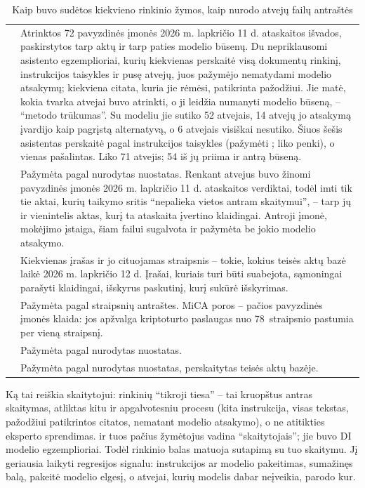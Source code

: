 \begin{table}[H]
\caption{Kaip buvo sudėtos kiekvieno rinkinio žymos, kaip nurodo atvejų failų antraštės}\label{tab:control:labels}
\begin{tabularx}{\textwidth}{@{}L{22mm}Y@{}}
\toprule
{} &  \\
\midrule
{} & Atrinktos 72 pavyzdinės įmonės 2026 m. lapkričio 11 d. ataskaitos išvados, paskirstytos tarp aktų ir tarp paties modelio būsenų. Du nepriklausomi asistento egzemplioriai, kurių kiekvienas perskaitė visą dokumentų rinkinį, instrukcijos taisykles ir pusę atvejų, juos pažymėjo nematydami modelio atsakymų; kiekviena citata, kuria jie rėmėsi, patikrinta pažodžiui. Jie matė, kokia tvarka atvejai buvo atrinkti, o ji leidžia numanyti modelio būseną, -- \enquote{metodo trūkumas}. Su modeliu jie sutiko 52 atvejais, 14 atvejų jo atsakymą įvardijo kaip pagrįstą alternatyvą, o 6 atvejais visiškai nesutiko. Šiuos šešis asistentas perskaitė pagal instrukcijos taisykles (pažymėti ; liko penki), o vienas pašalintas. Liko 71 atvejis; 54 iš jų priima ir antrą būseną. \\
 & Pažymėta pagal  nurodytas nuostatas. Renkant atvejus buvo žinomi pavyzdinės įmonės 2026 m. lapkričio 11 d. ataskaitos verdiktai, todėl imti tik tie aktai, kurių taikymo sritis \enquote{nepalieka vietos antram skaitymui}, -- tarp jų ir vienintelis aktas, kurį ta ataskaita įvertino klaidingai. Antroji įmonė, mokėjimo įstaiga, šiam failui sugalvota ir pažymėta be jokio modelio atsakymo. \\
 & Kiekvienas įrašas ir jo cituojamas straipsnis -- tokie, kokius teisės aktų bazė laikė 2026 m. lapkričio 12 d. Įrašai, kuriais turi būti suabejota, sąmoningai parašyti klaidingai, išskyrus paskutinį, kurį sukūrė išskyrimas. \\
 & Pažymėta pagal straipsnių antraštes. MiCA poros -- pačios pavyzdinės įmonės klaida: jos apžvalga kriptoturto paslaugas nuo 78~straipsnio pastumia per vieną straipsnį. \\
 & Pažymėta pagal  nurodytas nuostatas. \\
 & Pažymėta pagal  nurodytas nuostatas, perskaitytas teisės aktų bazėje. \\
\bottomrule
\end{tabularx}
\end{table}

Ką tai reiškia skaitytojui: rinkinių \enquote{tikroji tiesa} -- tai kruopštus antras
skaitymas, atliktas kitu ir apgalvotesniu procesu (kita instrukcija, visas tekstas, pažodžiui
patikrintos citatos, nematant modelio atsakymo), o ne atitikties eksperto sprendimas.
 ir  tuos pačius žymėtojus vadina
\enquote{skaitytojais}; jie buvo DI modelio egzemplioriai. Todėl rinkinio balas matuoja
sutapimą su tuo skaitymu. Jį geriausia laikyti regresijos signalu: instrukcijos ar modelio
pakeitimas, sumažinęs balą, pakeitė modelio elgesį, o atvejai, kurių modelis dabar neįveikia,
parodo kur.

